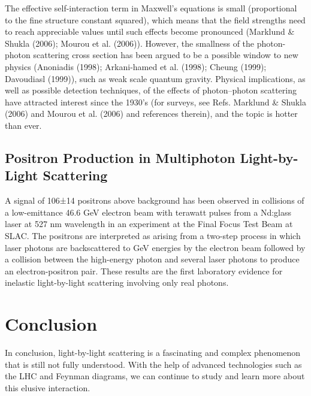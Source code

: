 \documentclass{article}
\begin{document}
The effective self-interaction term in Maxwell’s equations is small (proportional to the fine structure constant squared), which means that the field strengths need to reach appreciable values until such effects become pronounced (Marklund \& Shukla (2006); Mourou et al. (2006)). However, the smallness of the photon-photon scattering cross section has been argued to be a possible window to new physics (Anoniadis (1998); Arkani-hamed et al. (1998); Cheung (1999); Davoudiasl (1999)), such as weak scale quantum gravity. Physical implications, as well as possible detection techniques, of the effects of photon–photon scattering have attracted interest since the 1930’s (for surveys, see Refs. Marklund \& Shukla (2006) and Mourou et al. (2006) and references therein), and the topic is hotter than ever.

\subsection{Positron Production in Multiphoton Light-by-Light Scattering}%
\label{subsec:positron}

\label{subsec:light-light-low-energy}
A signal of 106±14 positrons above background has been observed in collisions of a low-emittance 46.6 GeV electron beam with terawatt pulses from a Nd:glass laser at 527 nm wavelength in an experiment at the Final Focus Test Beam at SLAC. The positrons are interpreted as arising from a two-step process in which laser photons are backscattered to GeV energies by the electron beam followed by a collision between the high-energy photon and several laser photons to produce an electron-positron pair. These results are the first laboratory evidence for inelastic light-by-light scattering involving only real photons.\cite{PhysRevLett.79.1626}

\section{Conclusion}
In conclusion, light-by-light scattering is a fascinating and complex phenomenon that is still not fully understood. With the help of advanced technologies such as the LHC and Feynman diagrams, we can continue to study and learn more about this elusive interaction.

\newpage
\printbibliography
\end{document}
